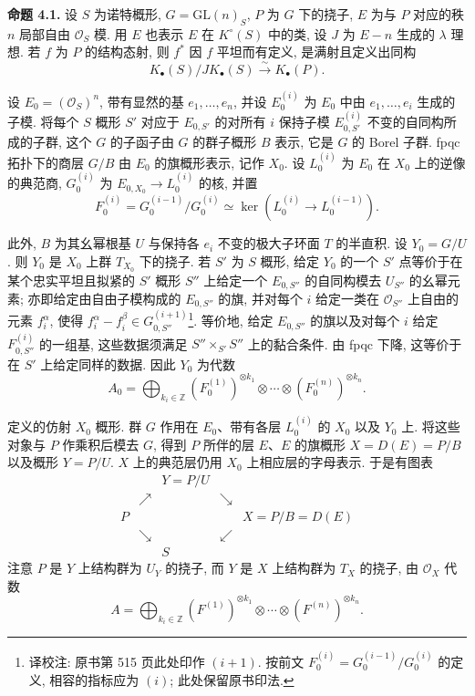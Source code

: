 \textbf{命题 4.1.} 设 $S$ 为诺特概形, $G=\mathrm{GL}(n)_S$, $P$ 为 $G$ 下的挠子, $E$ 为与 $P$ 对应的秩 $n$ 局部自由 $\mathcal O_S$ 模. 用 $E$ 也表示 $E$ 在 $K^\circ(S)$ 中的类, 设 $J$ 为 $E-n$ 生成的 $\lambda$ 理想. 若 $f$ 为 $P$ 的结构态射, 则 $f^*$ 因 $f$ 平坦而有定义, 是满射且定义出同构
\[
 K_\bullet(S)/J K_\bullet(S)\xrightarrow{\sim}K_\bullet(P).
\]

设 $E_0=(\mathcal O_S)^n$, 带有显然的基 $e_1,\ldots,e_n$, 并设 $E_0^{(i)}$ 为 $E_0$ 中由 $e_1,\ldots,e_i$ 生成的子模. 将每个 $S$ 概形 $S'$ 对应于 $E_{0,S'}$ 的对所有 $i$ 保持子模 $E_{0,S'}^{(i)}$ 不变的自同构所成的子群, 这个 $G$ 的子函子由 $G$ 的群子概形 $B$ 表示, 它是 $G$ 的 Borel 子群. fpqc 拓扑下的商层 $G/B$ 由 $E_0$ 的旗概形表示, 记作 $X_0$. 设 $L_0^{(i)}$ 为 $E_0$ 在 $X_0$ 上的逆像的典范商, $G_0^{(i)}$ 为 $E_{0,X_0}\to L_0^{(i)}$ 的核, 并置
\[
 F_0^{(i)}=G_0^{(i-1)}/G_0^{(i)}\simeq \ker(L_0^{(i)}\to L_0^{(i-1)}).
\]

此外, $B$ 为其幺幂根基 $U$ 与保持各 $e_i$ 不变的极大子环面 $T$ 的半直积. 设 $Y_0=G/U$. 则 $Y_0$ 是 $X_0$ 上群 $T_{X_0}$ 下的挠子. 若 $S'$ 为 $S$ 概形, 给定 $Y_0$ 的一个 $S'$ 点等价于在某个忠实平坦且拟紧的 $S'$ 概形 $S''$ 上给定一个 $E_{0,S''}$ 的自同构模去 $U_{S''}$ 的幺幂元素; 亦即给定由自由子模构成的 $E_{0,S''}$ 的旗, 并对每个 $i$ 给定一类在 $\mathcal O_{S''}$ 上自由的元素 $f_i^\alpha$, 使得 $f_i^\alpha-f_i^\beta\in G_{0,S''}^{(i+1)}$\footnote{译校注: 原书第 515 页此处印作 $(i+1)$. 按前文 $F_0^{(i)}=G_0^{(i-1)}/G_0^{(i)}$ 的定义, 相容的指标应为 $(i)$; 此处保留原书印法.}. 等价地, 给定 $E_{0,S''}$ 的旗以及对每个 $i$ 给定 $F_{0,S''}^{(i)}$ 的一组基, 这些数据须满足 $S''\times_{S'}S''$ 上的黏合条件. 由 fpqc 下降, 这等价于在 $S'$ 上给定同样的数据. 因此 $Y_0$ 为代数
\[
 A_0=\bigoplus_{k_i\in\mathbb Z}(F_0^{(1)})^{\otimes k_1}\otimes\cdots\otimes(F_0^{(n)})^{\otimes k_n}.
\]

定义的仿射 $X_0$ 概形. 群 $G$ 作用在 $E_0$、带有各层 $L_0^{(i)}$ 的 $X_0$ 以及 $Y_0$ 上. 将这些对象与 $P$ 作乘积后模去 $G$, 得到 $P$ 所伴的层 $E$、$E$ 的旗概形 $X=D(E)=P/B$ 以及概形 $Y=P/U$. $X$ 上的典范层仍用 $X_0$ 上相应层的字母表示. 于是有图表
\[
\begin{array}{ccccc}
&& Y=P/U &&\\[-0.2em]
& \nearrow && \searrow &\\[-0.2em]
P &&&& X=P/B=D(E)\\[-0.2em]
& \searrow && \swarrow &\\[-0.2em]
&& S &&
\end{array}
\]
注意 $P$ 是 $Y$ 上结构群为 $U_Y$ 的挠子, 而 $Y$ 是 $X$ 上结构群为 $T_X$ 的挠子, 由 $\mathcal O_X$ 代数
\[
 A=\bigoplus_{k_i\in\mathbb Z}(F^{(1)})^{\otimes k_1}\otimes\cdots\otimes(F^{(n)})^{\otimes k_n}.
\]


